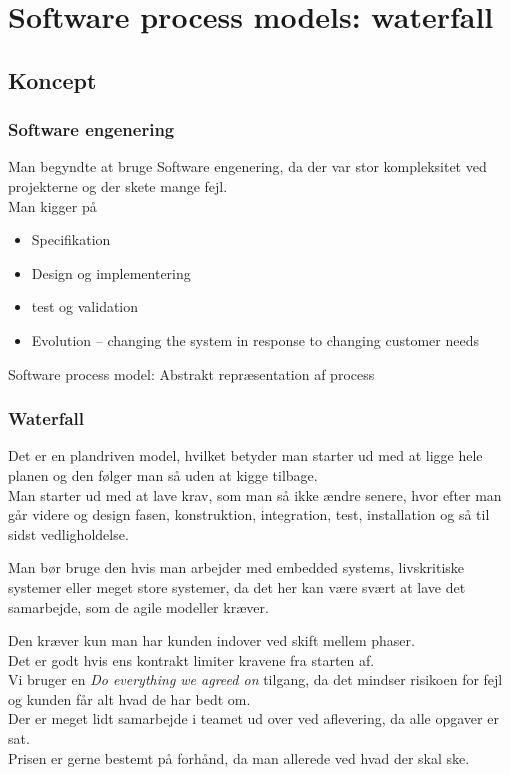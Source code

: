\documentclass[11pt,a4paper]{article}
\begin{document}
\section{Software process models: waterfall}
\subsection{Koncept}
\subsubsection{Software engenering}
Man begyndte at bruge Software engenering, da der var stor kompleksitet ved projekterne og der skete mange fejl.\\
Man kigger på 
\begin{itemize}
\item Specifikation
\item Design og implementering
\item test og validation
\item Evolution – changing the system in response to changing customer needs
\end{itemize}
Software process model: Abstrakt repræsentation af process

\subsubsection{Waterfall}
Det er en plandriven model, hvilket betyder man starter ud med at ligge hele planen og den følger man så uden at kigge tilbage.\\
Man starter ud med at lave krav, som man så ikke ændre senere, hvor efter man går videre og design fasen, konstruktion, integration, test, installation og så til sidst vedligholdelse.

Man bør bruge den hvis man arbejder med embedded systems, livskritiske systemer eller meget store systemer, da det her kan være svært at lave det samarbejde, som de agile modeller kræver.

Den kræver kun man har kunden indover ved skift mellem phaser.\\
Det er godt hvis ens kontrakt limiter kravene fra starten af.\\
Vi bruger en \textit{Do everything we agreed on} tilgang, da det mindser risikoen for fejl og kunden får alt hvad de har bedt om.\\
Der er meget lidt samarbejde i teamet ud over ved aflevering, da alle opgaver er sat.\\
Prisen er gerne bestemt på forhånd, da man allerede ved hvad der skal ske.
\end{document}
